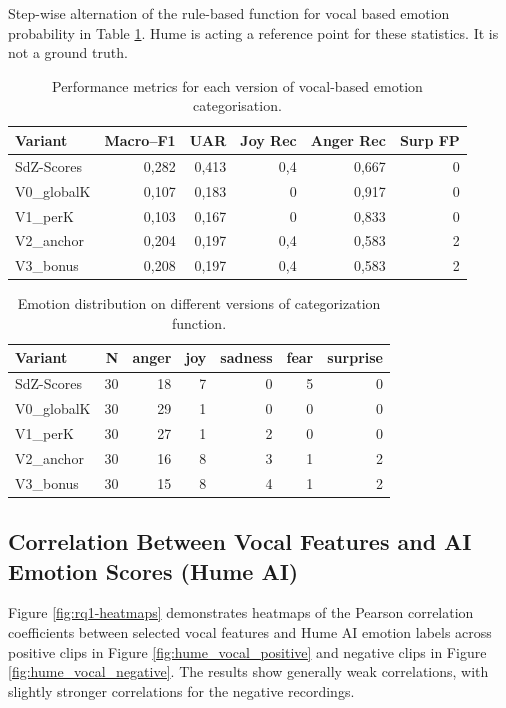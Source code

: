Step-wise alternation of the rule-based function for vocal based emotion probability in Table \ref{tab:rq1_categor.func-stats}. 
Hume is acting a reference point for these statistics. It is not a ground truth. 
\begin{table}[ht]
    \centering
    \begin{tabular}{lrrrrr}
      \toprule
      Variant       & Macro–F1 &   UAR  & Joy Rec & Anger Rec & Surp FP \\
      \midrule
      SdZ-Scores    &   0,282  &  0,413 &    0,4  &     0,667 &       0 \\
      V0\_globalK   &   0,107  &  0,183 &    0    &     0,917 &       0 \\
      V1\_perK      &   0,103  &  0,167 &    0    &     0,833 &       0 \\
      V2\_anchor    &   0,204  &  0,197 &    0,4  &     0,583 &       2 \\
      V3\_bonus     &   0,208  &  0,197 &    0,4  &     0,583 &       2 \\
      \bottomrule
    \end{tabular}
    \caption{Performance metrics for each version of vocal-based emotion categorisation.}
    \label{tab:rq1_categor.func-stats}
  \end{table}


\begin{table}[ht]
    \centering
    \begin{tabular}{lrrrrrr}
      \toprule
      Variant      &  N & anger & joy & sadness & fear & surprise \\
      \midrule
      SdZ-Scores   & 30 &    18 &   7 &       0 &    5 &        0 \\
      V0\_globalK  & 30 &    29 &   1 &       0 &    0 &        0 \\
      V1\_perK     & 30 &    27 &   1 &       2 &    0 &        0 \\
      V2\_anchor   & 30 &    16 &   8 &       3 &    1 &        2 \\
      V3\_bonus    & 30 &    15 &   8 &       4 &    1 &        2 \\
      \bottomrule
    \end{tabular}
    \caption{Emotion distribution on different versions of categorization function.}
    \label{tab:rq1_emotion-cat-labels}
  \end{table}

  

  
\subsection{Correlation Between Vocal Features and AI Emotion Scores (Hume AI)}
Figure \ref{fig:rq1-heatmaps} demonstrates heatmaps of the Pearson correlation coefficients between selected vocal features and Hume AI emotion labels across positive clips in Figure \ref{fig:hume_vocal_positive} and negative clips in Figure \ref{fig:hume_vocal_negative}. The results show generally weak correlations, with slightly stronger correlations for the negative recordings.  

